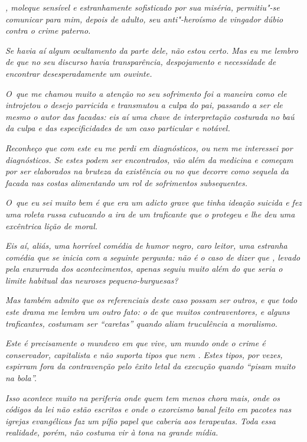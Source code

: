 \emph{, moleque sensível e estranhamente sofisticado por sua miséria,
permitiu"-se comunicar para mim, depois de adulto, seu anti"-heroísmo de
vingador dúbio contra o crime paterno.}~

\emph{Se havia aí algum ocultamento da parte dele, não estou certo. Mas
eu me lembro de que no seu discurso havia transparência, despojamento e
necessidade de encontrar desesperadamente um ouvinte.}~

\emph{O~que me chamou muito a atenção no seu sofrimento foi a maneira
como ele introjetou o desejo parricida e transmutou a culpa do pai,
passando a ser ele mesmo o autor das facadas: eis aí uma chave de
interpretação costurada no baú da culpa e das especificidades de um caso
particular e notável.}~

\emph{Reconheço que com este  eu me perdi em diagnósticos, ou nem me
interessei por diagnósticos. Se estes podem ser encontrados, vão além da
medicina e começam por ser elaborados na bruteza da existência ou no que
decorre como sequela da facada nas costas alimentando um rol de
sofrimentos subsequentes.}~

\emph{O~que eu sei muito bem é que  era um adicto grave que tinha
ideação suicida e fez uma roleta russa cutucando a ira de um traficante
que o protegeu e lhe deu uma excêntrica lição de moral.}~

\emph{Eis aí, aliás, uma horrível comédia de humor negro, caro leitor,
uma estranha comédia que se inicia com a seguinte pergunta: não é o caso
de dizer que , levado pela enxurrada dos acontecimentos, apenas seguiu
muito além do que seria o limite habitual das neuroses pequeno-burguesas?}~

\emph{Mas também admito que os referenciais deste caso possam ser
outros, e que todo este drama me lembra um outro fato: o de que muitos
contraventores, e alguns traficantes, costumam ser ``caretas'' quando
aliam truculência a moralismo.}~

\emph{Este é precisamente o mundevo em que  vive, um mundo onde o crime
é conservador, capitalista e não suporta tipos que nem . Estes tipos,
por vezes, espirram fora da contravenção pelo êxito letal da execução
quando ``pisam muito na bola''.}~

\emph{Isso acontece muito na periferia onde quem tem menos chora mais,
onde os códigos da lei não estão escritos e onde o exorcismo banal feito
em pacotes nas igrejas evangélicas faz um pífio papel que caberia aos
terapeutas. Toda essa realidade, porém, não costuma vir à tona na grande
mídia.}


